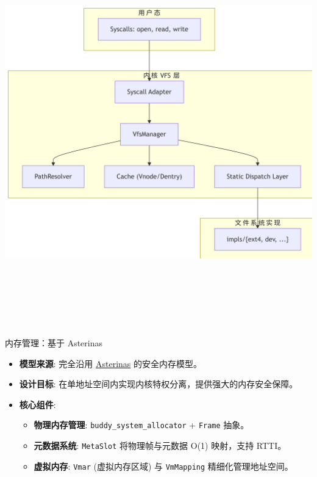 \documentclass[
  ignorenonframetext,
]{beamer}
\providecommand{\tightlist}{%
  \setlength{\itemsep}{0pt}\setlength{\parskip}{0pt}}
\begin{document}
\begin{frame}
\includegraphics[width=8.02in,height=6.63in]{slide_files/figure-beamer/mermaid-figure-1.png}
\end{frame}

\begin{frame}[fragile]
\begin{block}{内存管理：基于 Asterinas}
\label{ux5185ux5b58ux7ba1ux7406ux57faux4e8e-asterinas}
\begin{itemize}
\tightlist
\item
  \textbf{模型来源}: 完全沿用
  \href{https://github.com/asterinas/asterinas}{Asterinas}
  的安全内存模型。
\item
  \textbf{设计目标}:
  在单地址空间内实现内核特权分离，提供强大的内存安全保障。
\item
  \textbf{核心组件}:

  \begin{itemize}
  \tightlist
  \item
    \textbf{物理内存管理}: \texttt{buddy\_system\_allocator} +
    \texttt{Frame} 抽象。
  \item
    \textbf{元数据系统}: \texttt{MetaSlot} 将物理帧与元数据 O(1)
    映射，支持 RTTI。
  \item
    \textbf{虚拟内存}: \texttt{Vmar} (虚拟内存区域) 与
    \texttt{VmMapping} 精细化管理地址空间。
  \end{itemize}
\end{itemize}
\end{block}
\end{frame}
\end{document}
